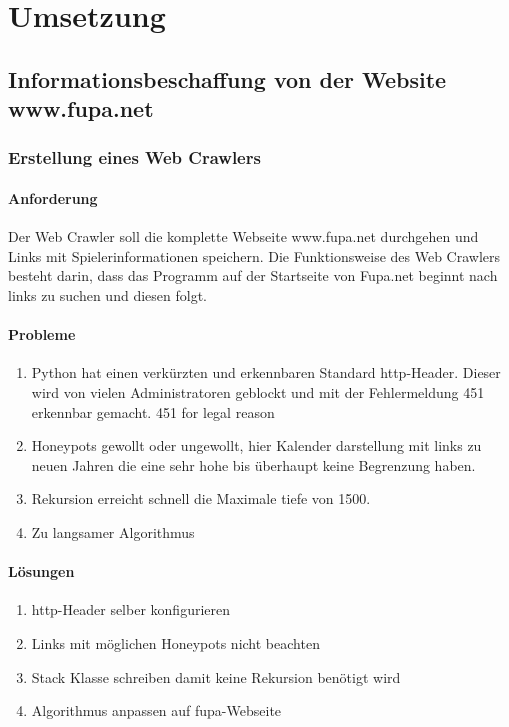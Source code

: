 
\chapter{Umsetzung}  %
\label{cha:} %
\section{Informationsbeschaffung von der Website www.fupa.net} %
\label{sec:} %


\subsection{Erstellung eines Web Crawlers} %
\label{sse:}
\subsubsection{Anforderung}
Der Web Crawler soll die komplette Webseite www.fupa.net durchgehen und Links mit Spielerinformationen speichern.
Die Funktionsweise des Web Crawlers besteht darin, dass das Programm auf der Startseite von Fupa.net beginnt nach links zu suchen und diesen folgt.
\subsubsection{Probleme} %
\begin{enumerate}
	\item Python hat einen verkürzten und erkennbaren Standard http-Header. Dieser wird von vielen Administratoren geblockt und mit der Fehlermeldung 451 erkennbar gemacht. 451 for legal reason
	\item Honeypots gewollt oder ungewollt, hier Kalender darstellung mit links zu neuen Jahren die eine sehr hohe bis überhaupt keine Begrenzung haben.
	\item Rekursion erreicht schnell die Maximale tiefe von 1500.
	\item Zu langsamer Algorithmus
\end{enumerate}


\subsubsection{Lösungen}
\begin{enumerate}
	\item http-Header selber konfigurieren
	\item Links mit möglichen Honeypots nicht beachten
	\item Stack Klasse schreiben damit keine Rekursion benötigt wird
	\item Algorithmus anpassen auf fupa-Webseite
\end{enumerate}
\label{sss:}
